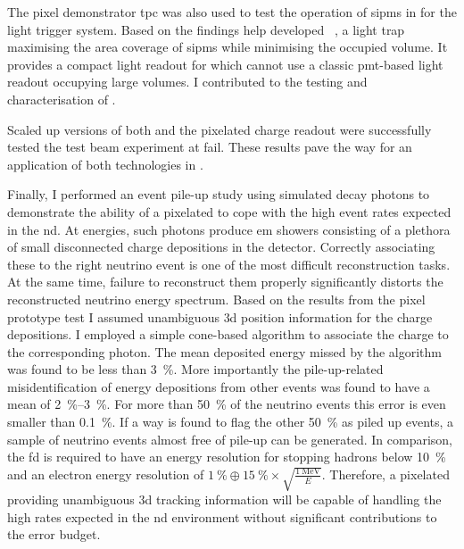 The pixel demonstrator \gls{tpc} was also used to test the operation of \glspl{sipm} in \lar{} for the light trigger system.
Based on the findings \gls{help} developed \AL{}~\cite{arclight}, a light trap maximising the area coverage of \glspl{sipm} while minimising the occupied volume.
It provides a compact light readout for \AC{} which cannot use a classic \gls{pmt}-based light readout occupying large volumes.
I contributed to the testing and characterisation of \AL{}.

Scaled up versions of both \AL{} and the pixelated charge readout were successfully tested the \pixlar{} test beam experiment at \gls{fail}.
These results pave the way for an application of both technologies in \AC{}.

Finally, I performed an event pile-up study using simulated \Pgpz decay photons to demonstrate the ability of a pixelated \lartpc{} to cope with the high event rates expected in the \dune{} \gls{nd}.
At \dune{} energies, such photons produce \gls{em} showers consisting of a plethora of small disconnected charge depositions in the detector.
Correctly associating these to the right neutrino event is one of the most difficult reconstruction tasks.
At the same time, failure to reconstruct them properly significantly distorts the reconstructed neutrino energy spectrum.
Based on the results from the pixel prototype test I assumed unambiguous \gls{3d} position information for the charge depositions.
I employed a simple cone-based algorithm to associate the charge to the corresponding photon.
The mean deposited energy missed by the algorithm was found to be less than \SI{3}{\percent}.
More importantly the pile-up-related misidentification of energy depositions from other events was found to have a mean of \SIrange{2}{3}{\percent}.
For more than \SI{50}{\percent} of the neutrino events this error is even smaller than \SI{0.1}{\percent}.
If a way is found to flag the other \SI{50}{\percent} as piled up events, a sample of neutrino events almost free of pile-up can be generated.
In comparison, the \gls{fd} is required to have an energy resolution for stopping hadrons below \SI{10}{\percent} and an electron energy resolution of $\SI{1}{\percent} \oplus \SI{15}{\percent} \times \sqrt{\frac{\SI{1}{\mega\electronvolt}}{E}}$.
Therefore, a pixelated \AC{} providing unambiguous \gls{3d} tracking information will be capable of handling the high rates expected in the \dune{} \gls{nd} environment without significant contributions to the error budget.

